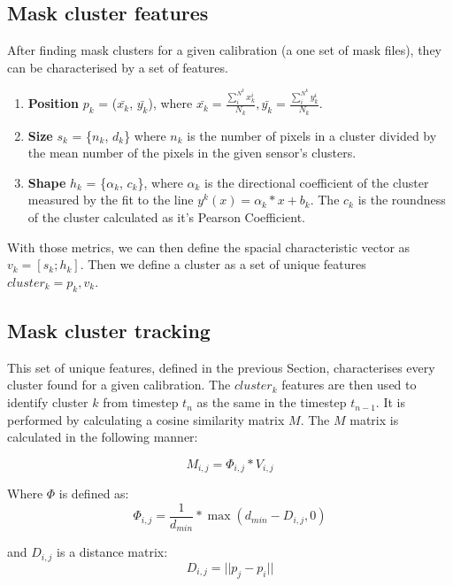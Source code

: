 \subsection{Mask cluster features}

After finding mask clusters for a given calibration (a one set of mask files), they can be characterised by a set of features.
\begin{enumerate}
\item \textbf{Position}  {$p_k$ = ($\bar{x_k}$, $\bar{y_k}$}), where $\bar{x_k} = \frac{\sum_{i}^{N^k}x_k^i}{N_k},
    \bar{y_k} = \frac{\sum_{i}^{N^k}y_k^i}{N_k}$.
\item \textbf{Size} $s_k$ = \{$n_k$, $d_k$\} where $n_k$ is the number of pixels in a cluster divided by the mean number of the pixels in the given sensor's clusters.
\item \textbf{Shape} $h_k$ = \{$\alpha_k$, $c_k$\}, where $\alpha_k$ is the directional coefficient of the cluster measured by the fit to the line $y^k(x) = \alpha_k*x + b_k$. The $c_k$ is the roundness of the cluster calculated as it's Pearson Coefficient.
\end{enumerate}
With those metrics, we can then define the spacial characteristic vector as $v_k = [s_k; h_k]$. Then we define a cluster as a set of unique features $cluster_k = {p_k, v_k}$.

\subsection{Mask cluster tracking}

This set of unique features, defined in the previous Section, characterises every cluster found for a given calibration.
The $cluster_{k}$ features are then used to identify cluster $k$ from timestep $t_{n}$ as the same in the timestep $t_{n-1}$.
It is performed by calculating a cosine similarity matrix $M$. The $M$ matrix is calculated in the following manner:

\begin{equation}
    M_{i,j} = \Phi_{i,j} * V_{i,j}
\end{equation}

Where $\Phi$ is defined as:
\begin{equation}
    \Phi_{i,j} = \frac{1}{d_{min}}*\max(d_{min} - D_{i,j}, 0)
\end{equation}

and $ D_{i,j} $ is a distance matrix:
 \begin{equation}D_{i,j} = || p_j - p_i ||\end{equation}


